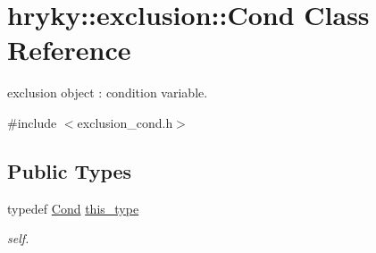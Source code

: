 \hypertarget{classhryky_1_1exclusion_1_1_cond}{\section{hryky\-:\-:exclusion\-:\-:Cond Class Reference}
\label{classhryky_1_1exclusion_1_1_cond}
}


exclusion object \-: condition variable.  




{\ttfamily \#include $<$exclusion\-\_\-cond.\-h$>$}

\subsection*{Public Types}
\begin{DoxyCompactItemize}
\item 
\hypertarget{classhryky_1_1exclusion_1_1_cond_af877ae99e3b153e94c01d0e15b6a0acc}{typedef \hyperlink{classhryky_1_1exclusion_1_1_cond}{Cond} \hyperlink{classhryky_1_1exclusion_1_1_cond_af877ae99e3b153e94c01d0e15b6a0acc}{this\-\_\-type}}\label{classhryky_1_1exclusion_1_1_cond_af877ae99e3b153e94c01d0e15b6a0acc}

\begin{DoxyCompactList}\small\item\em self. \end{DoxyCompactList}\end{DoxyCompactItemize}
